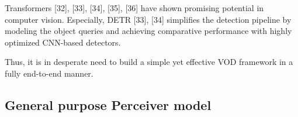 
Transformers [32], [33], [34], [35], [36] have shown promising potential in computer vision. Especially, DETR [33], [34] simplifies the detection pipeline by modeling the object queries and achieving comparative performance with highly optimized CNN-based detectors.

Thus, it is in desperate need to build a simple yet effective VOD framework in a fully end-to-end manner.

\subsection{General purpose Perceiver model} \label{Background:VideoObjectDetection}